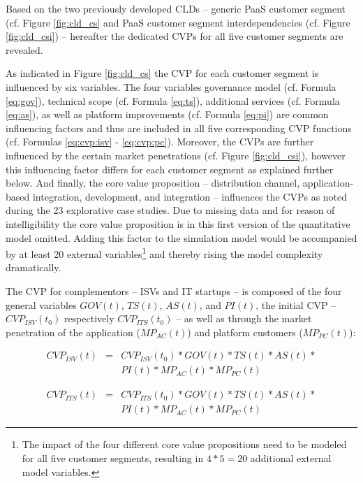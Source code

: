 Based on the two previously developed \acp{CLD} -- generic \ac{PaaS} customer segment (cf. Figure \ref{fig:cld_cs} and \ac{PaaS} customer segment interdependencies (cf. Figure \ref{fig:cld_csi}) -- hereafter the dedicated \acp{CVP} for all five customer segments are revealed.

As indicated in Figure \ref{fig:cld_cs} the \ac{CVP} for each customer segment is influenced by six variables. The four variables governance model (cf. Formula \ref{eq:gov}), technical scope (cf. Formula \ref{eq:ts}), additional services (cf. Formula \ref{eq:as}), as well as platform improvements (cf. Formula \ref{eq:pi}) are common influencing factors and thus are included in all five corresponding \ac{CVP} functions (cf. Formulas \ref{eq:cvp:isv} - \ref{eq:cvp:pc}). Moreover, the \acp{CVP} are further influenced by the certain market penetrations (cf. Figure \ref{fig:cld_csi}), however this influencing factor differs for each customer segment as explained further below. And finally, the core value proposition -- distribution channel, application-based integration, development, and integration -- influences the \acp{CVP} as noted during the 23 explorative case studies. Due to missing data and for reason of intelligibility the core value proposition is in this first version of the quantitative model omitted. Adding this factor to the simulation model would be accompanied by at least 20 external variables\footnote{The impact of the four different core value propositions need to be modeled for all five customer segments, resulting in $4*5=20$ additional external model variables.} and thereby rising the model complexity dramatically.

The \ac{CVP} for complementors -- \acp{ISV} and \ac{IT} startups -- is composed of the four general variables $GOV(t)$, $TS(t)$, $AS(t)$, and $PI(t)$, the initial \ac{CVP} -- $CVP_{ISV}(t_0)$ respectively $ CVP_{ITS}(t_0)$ -- as well as through the market penetration of the application ($MP_{AC}(t)$) and platform customers ($MP_{PC}(t)$):

\begin{eqnarray}\label{eq:cvp:isv}
		CVP_{ISV}(t) & = & CVP_{ISV}(t_0) * GOV(t) * TS(t) * AS(t) * \nonumber \\ & & PI(t) * MP_{AC}(t) * MP_{PC}(t)
\end{eqnarray}

\begin{eqnarray}\label{eq:cvp:its}
		CVP_{ITS}(t) & = & CVP_{ITS}(t_0) * GOV(t) * TS(t) * AS(t) * \nonumber \\ & & PI(t) * MP_{AC}(t) * MP_{PC}(t)
\end{eqnarray}

